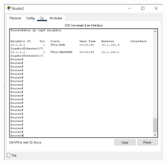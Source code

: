 \documentclass{article}
\begin{document}
\begin{figure}[H]
    \centering
    \includegraphics[width=0.75\textwidth]{figures/20.jpg}
    \caption{}
    \label{fig:fig1}
\end{figure}



\section{}%
\end{document}
